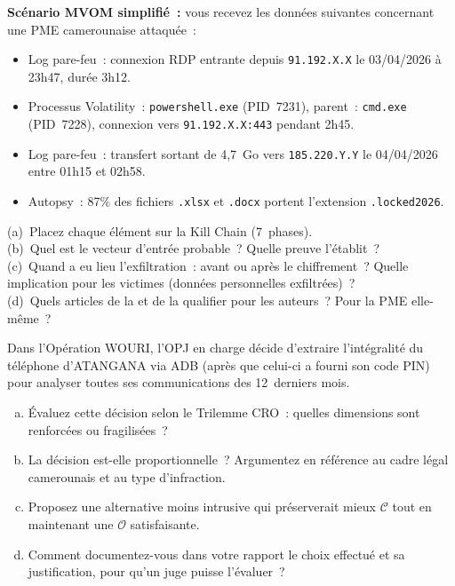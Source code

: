 \begin{boxexo}[title={\ding{45}\quad Exercice~3.2 --- Reconstitution d'attaque \niveaumoyen}]
\textbf{Scénario MVOM simplifié~:} vous recevez les données suivantes
concernant une PME camerounaise attaquée~:

\begin{itemize}
    \item Log pare-feu~: connexion RDP entrante depuis \texttt{91.192.X.X}
          le 03/04/2026 à 23h47, durée 3h12.
    \item Processus Volatility~: \texttt{powershell.exe} (PID~7231),
          parent~: \texttt{cmd.exe} (PID~7228), connexion vers
          \texttt{91.192.X.X:443} pendant 2h45.
    \item Log pare-feu~: transfert sortant de 4,7~Go vers \texttt{185.220.Y.Y}
          le 04/04/2026 entre 01h15 et 02h58.
    \item Autopsy~: 87\% des fichiers \texttt{.xlsx} et \texttt{.docx}
          portent l'extension \texttt{.locked2026}.

\end{itemize}

(a)~Placez chaque élément sur la Kill Chain (7~phases).\\
(b)~Quel est le vecteur d'entrée probable~? Quelle preuve l'établit~?\\
(c)~Quand a eu lieu l'exfiltration~: avant ou après le chiffrement~?
Quelle implication pour les victimes (données personnelles exfiltrées)~?\\
(d)~Quels articles de la  et de la 
qualifier pour les auteurs~? Pour la PME elle-même~?
\end{boxexo}

\begin{boxexo}[title={\ding{45}\quad Exercice~3.3 --- Analyse CRO d'une décision
investigative \niveauexpert}]
Dans l'Opération WOURI, l'OPJ en charge décide d'extraire l'intégralité
du téléphone d'ATANGANA via ADB (après que celui-ci a fourni son code PIN)
pour analyser toutes ses communications des 12~derniers mois.

\begin{enumerate}[(a)]
    \item Évaluez cette décision selon le Trilemme CRO~: quelles
          dimensions sont renforcées ou fragilisées~?
    \item La décision est-elle proportionnelle~? Argumentez en référence
          au cadre légal camerounais et au type d'infraction.
    \item Proposez une alternative moins intrusive qui préserverait mieux
          $\mathcal{C}$ tout en maintenant une $\mathcal{O}$ satisfaisante.
    \item Comment documentez-vous dans votre rapport le choix effectué
          et sa justification, pour qu'un juge puisse l'évaluer~?
\end{enumerate}
\end{boxexo}

